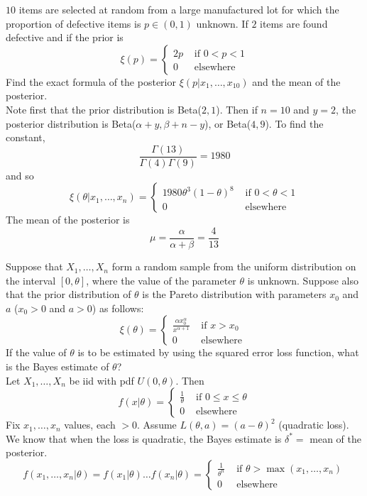 \documentclass[12pt]{article}
\begin{document}
\begin{question} $10$ items are selected at random from a large manufactured lot for which the proportion of defective items is $p \in (0,1)$ unknown. If $2$ items are found defective and if the prior is $$ \xi(p) = \begin{cases} 2p &\text{ if } 0 < p < 1 \\ 0 &\text{ elsewhere} \end{cases} $$ Find the exact formula of the posterior $\xi(p| x_1,\dots,x_{10})$ and the mean of the posterior.  \\
Note first that the prior distribution is Beta($2,1$). Then if $n=10$ and $y=2$, the posterior distribution is Beta($\alpha+y, \beta + n - y$), or Beta($4,9$). 
To find the constant, $$ \frac{\Gamma(13)}{\Gamma(4)\Gamma(9)} = 1980 $$ and so $$ \xi(\theta | x_1,\dots,x_n) = \begin{cases} 1980\theta^3(1-\theta)^8 &\text{ if } 0 < \theta < 1 \\ 0 &\text{ elsewhere } \end{cases} $$ 
The mean of the posterior is $$ \mu = \frac{\alpha}{\alpha+\beta} = \frac{4}{13} $$ 

\end{question} 

Suppose that $X_1,\dots,X_n$ form a random sample from the uniform distribution on the interval $[0,\theta]$, where the value of the parameter $\theta$ is unknown. Suppose also that the prior distribution of $\theta$ is the Pareto distribution with parameters $x_0$ and $a$ ($x_0 > 0$ and $a > 0$) as follows: $$\xi(\theta) = \begin{cases} \frac{\alpha x_0^\alpha}{x^{\alpha +1}} &\text{ if } x > x_0 \\ 0 &\text{ elsewhere } \end{cases} $$ 
If the value of $\theta$ is to be estimated by using the squared error loss function, what is the Bayes estimate of $\theta$? \\
Let $X_1,\dots,X_n$ be iid with pdf $U(0,\theta)$. Then $$f(x|\theta) = \begin{cases} \frac{1}{\theta} &\text{ if } 0 \leq x \leq \theta \\ 0 &\text{ elsewhere } \end{cases} $$ 
Fix $x_1,\dots,x_n$ values, each $> 0$. Assume $L(\theta,a) = (a-\theta)^2$ (quadratic loss). We know that when the loss is quadratic, the Bayes estimate is $\delta^* = $ mean of the posterior. 
$$f(x_1,\dots,x_n|\theta) = f(x_1|\theta)\dots f(x_n|\theta) = \begin{cases} \frac{1}{\theta^n} &\text{ if } \theta > \max(x_1,\dots,x_n) \\ 0 &\text{ elsewhere} \end{cases} $$
 
\end{document}

